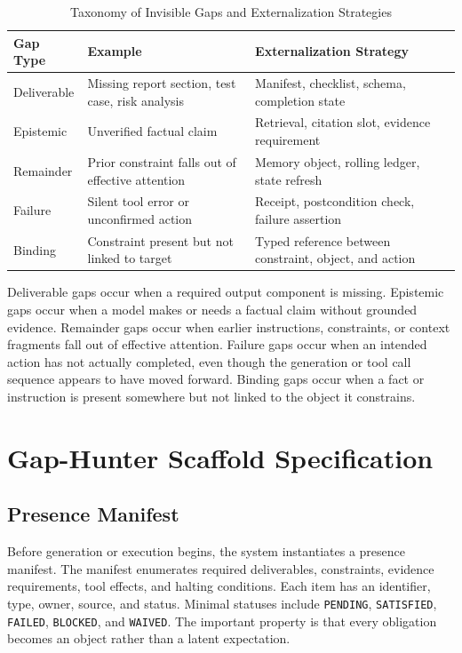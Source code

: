 \documentclass[10pt,conference]{IEEEtran}
\begin{document}
\begin{table}[!t]
\caption{Taxonomy of Invisible Gaps and Externalization Strategies}
\label{tab:gaps}
\centering
\small
\begin{tabular}{p{}p{}p{}}
\toprule
\textbf{Gap Type} & \textbf{Example} & \textbf{Externalization Strategy} \\
\midrule
Deliverable & Missing report section, test case, risk analysis & Manifest, checklist, schema, completion state \\
Epistemic & Unverified factual claim & Retrieval, citation slot, evidence requirement \\
Remainder & Prior constraint falls out of effective attention & Memory object, rolling ledger, state refresh \\
Failure & Silent tool error or unconfirmed action & Receipt, postcondition check, failure assertion \\
Binding & Constraint present but not linked to target & Typed reference between constraint, object, and action \\
\bottomrule
\end{tabular}
\end{table}

Deliverable gaps occur when a required output component is missing. Epistemic gaps occur when a model makes or needs a factual claim without grounded evidence. Remainder gaps occur when earlier instructions, constraints, or context fragments fall out of effective attention. Failure gaps occur when an intended action has not actually completed, even though the generation or tool call sequence appears to have moved forward. Binding gaps occur when a fact or instruction is present somewhere but not linked to the object it constrains.

\section{Gap-Hunter Scaffold Specification}
\subsection{Presence Manifest}
Before generation or execution begins, the system instantiates a presence manifest. The manifest enumerates required deliverables, constraints, evidence requirements, tool effects, and halting conditions. Each item has an identifier, type, owner, source, and status. Minimal statuses include \texttt{PENDING}, \texttt{SATISFIED}, \texttt{FAILED}, \texttt{BLOCKED}, and \texttt{WAIVED}. The important property is that every obligation becomes an object rather than a latent expectation.
\end{document}
